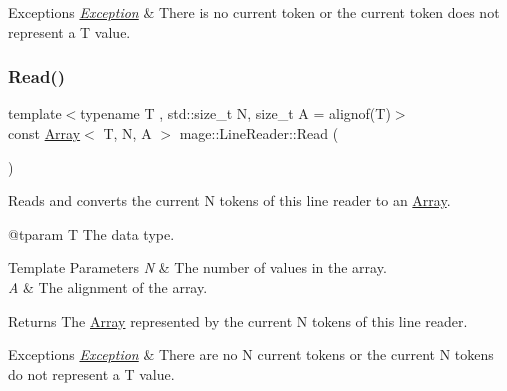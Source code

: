 \begin{DoxyExceptions}{Exceptions}
{\em \mbox{\hyperlink{classmage_1_1_exception}{Exception}}} & There is no current token or the current token does not represent a {\ttfamily T} value. \\
\hline
\end{DoxyExceptions}
\mbox{\label{classmage_1_1_line_reader_a208eb25a7715761178317eec72c93c75}} 
\subsubsection{\texorpdfstring{Read()}{Read()}\hspace{0.1cm}{\footnotesize\ttfamily [2/2]}}
{\footnotesize\ttfamily template$<$typename T , std\+::size\+\_\+t N, size\+\_\+t A = alignof(\+T)$>$ \\
const \mbox{\hyperlink{structmage_1_1_array}{Array}}$<$ T, N, A $>$ mage\+::\+Line\+Reader\+::\+Read (\begin{DoxyParamCaption}{ }\end{DoxyParamCaption})\hspace{0.3cm}{\ttfamily [protected]}}

Reads and converts the current {\ttfamily N} tokens of this line reader to an {\ttfamily \mbox{\hyperlink{structmage_1_1_array}{Array}}}.

@tparam T The data type. 
\begin{DoxyTemplParams}{Template Parameters}
{\em N} & The number of values in the array. \\
\hline
{\em A} & The alignment of the array. \\
\hline
\end{DoxyTemplParams}
\begin{DoxyReturn}{Returns}
The {\ttfamily \mbox{\hyperlink{structmage_1_1_array}{Array}}} represented by the current {\ttfamily N} tokens of this line reader. 
\end{DoxyReturn}

\begin{DoxyExceptions}{Exceptions}
{\em \mbox{\hyperlink{classmage_1_1_exception}{Exception}}} & There are no {\ttfamily N} current tokens or the current {\ttfamily N} tokens do not represent a {\ttfamily T} value. \\
\hline
\end{DoxyExceptions}
\mbox{\label{classmage_1_1_line_reader_aba8857b3d0f49250e312bd737d7d0e9c}} 
